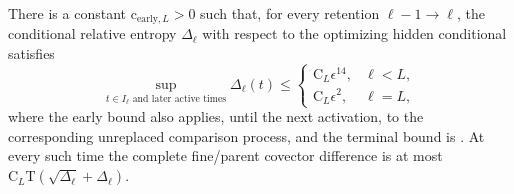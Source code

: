 There is a constant \(\mathrm c_{\mathrm{early},L}>0\) such that, for every
retention \(\ell-1\to\ell\), the conditional relative entropy \(\Delta_\ell\)
with respect to the optimizing hidden conditional satisfies
\begin{equation}
 \sup_{t\in I_\ell\text{ and later active times}}
 \Delta_\ell(t)
 \le
 \begin{cases}
 \mathrm C_L\epsilon^{14},&\ell<L,\\
 \mathrm C_L\epsilon^2,&\ell=L,
 \end{cases}
 \label{eq:rg-formation-conditional-final-bounds}
\end{equation}
where the early bound also applies, until the next activation, to the
corresponding unreplaced comparison process, and the terminal bound is
. At every such time the complete
fine/parent covector difference is at most
\(\mathrm C_L\mathrm T(\sqrt{\Delta_\ell}+\Delta_\ell)\). 

